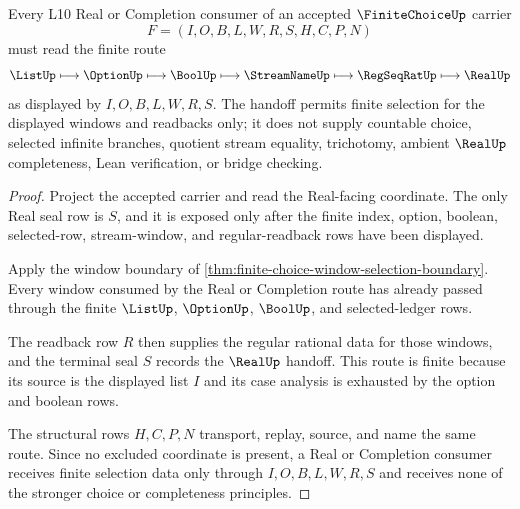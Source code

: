 \begin{theorem}
\label{thm:finite-choice-real-completion-handoff}
Every L10 Real or Completion consumer of an accepted $\FiniteChoiceUp$ carrier
$$
F=(I,O,B,L,W,R,S,H,C,P,N)
$$
must read the finite route
$$
\ListUp \longmapsto \OptionUp \longmapsto \BoolUp \longmapsto \StreamNameUp \longmapsto \RegSeqRatUp \longmapsto \RealUp
$$
as displayed by $I,O,B,L,W,R,S$. The handoff permits finite selection for the displayed windows and readbacks only; it does not supply countable choice, selected infinite branches, quotient stream equality, trichotomy, ambient $\RealUp$ completeness, Lean verification, or bridge checking.
\end{theorem}
\begin{proof}
Project the accepted carrier and read the Real-facing coordinate. The only Real seal row is $S$, and it is exposed only after the finite index, option, boolean, selected-row, stream-window, and regular-readback rows have been displayed.

Apply the window boundary of \autoref{thm:finite-choice-window-selection-boundary}. Every window consumed by the Real or Completion route has already passed through the finite $\ListUp$, $\OptionUp$, $\BoolUp$, and selected-ledger rows.

The readback row $R$ then supplies the regular rational data for those windows, and the terminal seal $S$ records the $\RealUp$ handoff. This route is finite because its source is the displayed list $I$ and its case analysis is exhausted by the option and boolean rows.

The structural rows $H,C,P,N$ transport, replay, source, and name the same route. Since no excluded coordinate is present, a Real or Completion consumer receives finite selection data only through $I,O,B,L,W,R,S$ and receives none of the stronger choice or completeness principles.
\end{proof}



